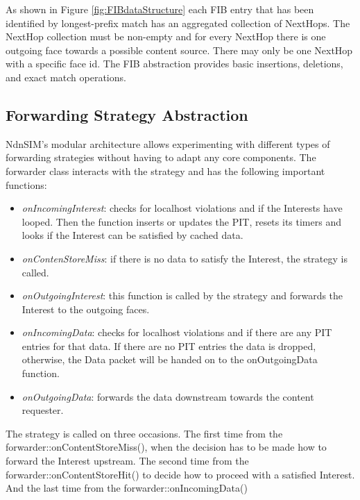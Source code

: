 \vspace{5mm} %

As shown in Figure \ref{fig:FIBdataStructure} each FIB entry that has been identified by longest-prefix match has an aggregated collection of NextHops. The NextHop collection must be non-empty and for every NextHop there is one outgoing face towards a possible content source. There may only be one NextHop with a specific face id. The FIB abstraction provides basic insertions, deletions, and exact match operations.

\subsection{Forwarding Strategy Abstraction}

NdnSIM's modular architecture allows experimenting with different types of forwarding strategies without having to adapt any core components. The forwarder class interacts with the strategy and has the following important functions:

\begin{itemize}
\item \emph{onIncomingInterest}: checks for localhost violations and if the Interests have looped. Then the function inserts or updates the PIT, resets its timers and looks if the Interest can be satisfied by cached data.
\item \emph{onContenStoreMiss}: if there is no data to satisfy the Interest, the strategy is called.
\item \emph{onOutgoingInterest}: this function is called by the strategy and forwards the Interest to the outgoing faces.
\item \emph{onIncomingData}: checks for localhost violations and if there are any PIT entries for that data. If there are no PIT entries the data is dropped, otherwise, the Data packet will be handed on to the onOutgoingData function.
\item \emph{onOutgoingData}: forwards the data downstream towards the content requester.
\end{itemize}


The strategy is called on three occasions. The first time from the forwarder::onContentStoreMiss(), when the decision has to be made how to forward the Interest upstream. The second time from the forwarder::onContentStoreHit() to decide how to proceed with a satisfied Interest. And the last time from the forwarder::onIncomingData()

\vspace{5mm} %

